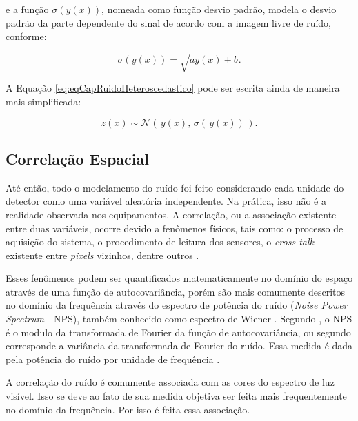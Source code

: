 \noindent e a função $\sigma(y(x)) $, nomeada como função desvio padrão, modela o desvio padrão da parte dependente do sinal de acordo com a imagem livre de ruído, conforme:

\begin{equation}
\sigma(y(x)) = \sqrt{ay(x)+b}.
\label{eq:eqCapRuidoHeteroscedasticoStd}
\end{equation} 

A Equação \ref{eq:eqCapRuidoHeteroscedastico} pode ser escrita ainda de maneira mais simplificada:

\begin{equation}
z(x) \sim  \mathcal{N}(\,y(x),\,\sigma(\,y(x)) \,).
\label{eq:eqCapRuidoHeteroscedasticoSimplificado}
\end{equation}

\subsection{Correlação Espacial}\label{Correlação}

Até então, todo o modelamento do ruído foi feito considerando cada unidade do detector como uma variável aleatória independente. Na prática, isso não é a realidade observada nos equipamentos. A correlação, ou a associação existente entre duas variáveis, ocorre devido a fenômenos físicos, tais como: o processo de aquisição do sistema, o procedimento de leitura dos sensores, o \textit{cross-talk} existente entre \textit{pixels} vizinhos, dentre outros \cite{morettin2010,bertalmiodenoising2018}. 

Esses fenômenos podem ser quantificados matematicamente no domínio do espaço através de uma função de autocovariância, porém são mais comumente descritos no domínio da frequência através do espectro de potência do ruído (\textit{Noise Power Spectrum} - \acs{NPS}), também conhecido como espectro de Wiener \cite[p. 485]{marshall2017handbook}. Segundo , o \acs{NPS} é o modulo da transformada de Fourier da função de autocovariância, ou segundo  corresponde a variância da transformada de Fourier do ruído. Essa medida é dada pela potência do ruído por unidade de frequência \cite{marshall2017handbook}.

A correlação do ruído é comumente associada com as cores do espectro de luz visível. Isso se deve ao fato de sua medida objetiva ser feita mais frequentemente no domínio da frequência. Por isso é feita essa associação. 


